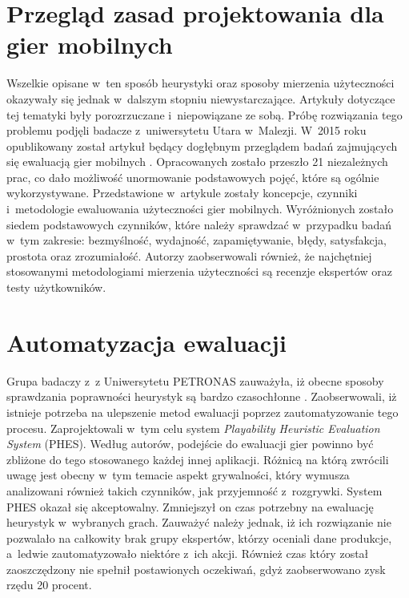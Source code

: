 \documentclass[a4paper,12pt,numbers=noenddot]{report}
\begin{document}
\section{Przegląd zasad projektowania dla gier mobilnych}
Wszelkie opisane w~ten sposób heurystyki oraz sposoby mierzenia użyteczności okazywały się jednak w~dalszym stopniu niewystarczające. Artykuły dotyczące tej tematyki były porozrzuczane i~niepowiązane ze sobą. Próbę rozwiązania tego problemu podjęli badacze z~uniwersytetu Utara w~Malezji. W~2015 roku opublikowany został artykuł będący dogłębnym przeglądem badań zajmujących się ewaluacją gier mobilnych \cite{art_UsabilityEvaluationSystematicReview}. Opracowanych zostało przeszło 21 niezależnych prac, co dało możliwość unormowanie podstawowych pojęć, które są ogólnie  wykorzystywane. Przedstawione w~artykule zostały koncepcje, czynniki i~metodologie ewaluowania użyteczności gier mobilnych. Wyróżnionych zostało siedem podstawowych czynników, które należy sprawdzać w~przypadku badań w~tym zakresie: bezmyślność, wydajność, zapamiętywanie, błędy, satysfakcja, prostota oraz zrozumiałość. Autorzy zaobserwowali również, że najchętniej stosowanymi metodologiami mierzenia użyteczności są recenzje ekspertów oraz testy użytkowników.

\section{Automatyzacja ewaluacji}
Grupa badaczy z~z Uniwersytetu PETRONAS zauważyła, iż obecne sposoby sprawdzania poprawności heurystyk są bardzo czasochłonne \cite{art_evaluationOfMGevaluationSystem}. Zaobserwowali, iż istnieje potrzeba na ulepszenie metod ewaluacji poprzez zautomatyzowanie tego procesu. Zaprojektowali w~tym celu system \textit{Playability Heuristic Evaluation System} (PHES). Według autorów, podejście do ewaluacji gier powinno być zbliżone do tego stosowanego każdej innej aplikacji. Różnicą na którą zwrócili uwagę jest obecny w~tym temacie aspekt grywalności, który wymusza analizowani również takich czynników, jak przyjemność z~rozgrywki. System PHES okazał się akceptowalny. Zmniejszył on czas potrzebny na ewaluację heurystyk w~wybranych grach. Zauważyć należy jednak, iż ich rozwiązanie nie pozwalało na całkowity brak grupy ekspertów, którzy oceniali dane produkcje, a~ledwie zautomatyzowało niektóre z~ich akcji. Również czas który został zaoszczędzony nie spełnił postawionych oczekiwań, gdyż zaobserwowano zysk rzędu 20 procent.
\end{document}
